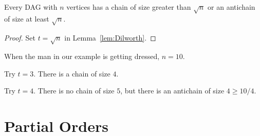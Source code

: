 \begin{corollary}\label{cor:Dilworth}
Every DAG with $n$ vertices has a chain of size greater
than $\sqrt{n}$ or an antichain of size at least $\sqrt{n}$.

\begin{proof}
  Set $t = \sqrt{n}$ in Lemma~\ref{lem:Dilworth}.
\end{proof}
\end{corollary}

\begin{example}
When the man in our example is getting dressed, $n = 10$.

Try $t = 3$.  There is a chain of size $4$.

Try $t = 4$.  There is no chain of size $5$, but there is an antichain of
size $4 \geq 10 / 4$.
\end{example}

\iffalse
\begin{example}
Suppose we have a class of 101 students.  Then using the product partial
order, $Y$, from Example~\ref{Y}, we can apply Dilworth's Lemma to
conclude that there is a chain of 11 students who get taller as they get
older, or an antichain of 11 students who get taller as they get younger,
which makes for an amusing in-class demo.
\end{example}
\fi

\begin{problems}
\practiceproblems
{}
{}

\classproblems
{}


\homeworkproblems
{}


\end{problems}

\section{Partial Orders}

